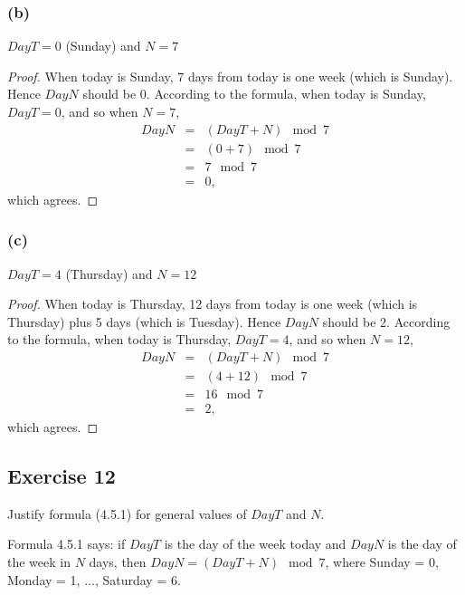 \documentclass[14pt]{extarticle}
\begin{document}
\subsubsection{(b)}
$DayT = 0$ (Sunday) and $N = 7$

\begin{proof}
    When today is Sunday, 7 days from today is one week (which is Sunday). Hence $DayN$ should be 0. According to the formula, when today is Sunday, $DayT = 0$, and so when $N = 7$,
    \[
        \begin{array}{rcl}
            DayN & = & (DayT + N) \mod 7 \\
                 & = & (0 + 7) \mod 7    \\
                 & = & 7 \mod 7          \\
                 & = & 0,
        \end{array}
    \]
    which agrees.
\end{proof}

\subsubsection{(c)}
$DayT = 4$ (Thursday) and $N = 12$

\begin{proof}
    When today is Thursday, 12 days from today is one week (which is Thursday) plus 5 days (which is Tuesday). Hence $DayN$ should be 2. According to the formula, when today is Thursday, $DayT = 4$, and so when $N = 12$,
    \[
        \begin{array}{rcl}
            DayN & = & (DayT + N) \mod 7 \\
                 & = & (4 + 12) \mod 7   \\
                 & = & 16 \mod 7         \\
                 & = & 2,
        \end{array}
    \]
    which agrees.
\end{proof}

\subsection{Exercise 12}
Justify formula (4.5.1) for general values of $DayT$ and $N$.

Formula 4.5.1 says: if $DayT$ is the day of the week today and $DayN$ is the day of the week in $N$ days, then $DayN = (DayT + N) \mod 7$, where Sunday = 0, Monday = 1, $\ldots$, Saturday = 6.
\end{document}
